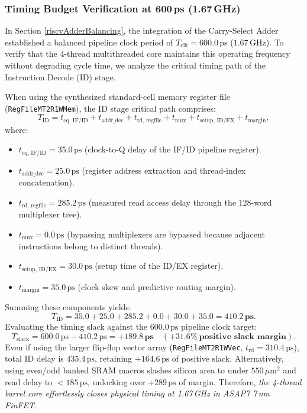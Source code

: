 \subsubsection{Timing Budget Verification at 600\,ps (1.67\,GHz)}
In Section \ref{riscvAdderBalancing}, the integration of the Carry-Select Adder established a balanced pipeline clock period of $T_{\text{clk}} = 600.0\,\text{ps}$ ($1.67\,\text{GHz}$). To verify that the 4-thread multithreaded core maintains this operating frequency without degrading cycle time, we analyze the critical timing path of the Instruction Decode (ID) stage.

When using the synthesized standard-cell memory register file (\texttt{RegFileMT2R1WMem}), the ID stage critical path comprises:
\begin{equation}
T_{\text{ID}} = t_{\text{cq, IF/ID}} + t_{\text{addr\_dec}} + t_{\text{rd, regfile}} + t_{\text{mux}} + t_{\text{setup, ID/EX}} + t_{\text{margin}},
\end{equation}
where:
\begin{itemize}
    \item $t_{\text{cq, IF/ID}} = 35.0\,\text{ps}$ (clock-to-Q delay of the IF/ID pipeline register).
    \item $t_{\text{addr\_dec}} = 25.0\,\text{ps}$ (register address extraction and thread-index concatenation).
    \item $t_{\text{rd, regfile}} = 285.2\,\text{ps}$ (measured read access delay through the 128-word multiplexer tree).
    \item $t_{\text{mux}} = 0.0\,\text{ps}$ (bypassing multiplexers are bypassed because adjacent instructions belong to distinct threads).
    \item $t_{\text{setup, ID/EX}} = 30.0\,\text{ps}$ (setup time of the ID/EX register).
    \item $t_{\text{margin}} = 35.0\,\text{ps}$ (clock skew and predictive routing margin).
\end{itemize}
Summing these components yields:
\begin{equation}
T_{\text{ID}} = 35.0 + 25.0 + 285.2 + 0.0 + 30.0 + 35.0 = \mathbf{410.2\,\text{ps}}.
\end{equation}
Evaluating the timing slack against the $600.0\,\text{ps}$ pipeline clock target:
\begin{equation}
T_{\text{slack}} = 600.0\,\text{ps} - 410.2\,\text{ps} = \mathbf{+189.8\,\text{ps}} \quad (\mathbf{+31.6\% \ \text{positive slack margin}}).
\end{equation}
Even if using the larger flip-flop vector array (\texttt{RegFileMT2R1WVec}, $t_{\text{rd}} = 310.4\,\text{ps}$), total ID delay is $435.4\,\text{ps}$, retaining $+164.6\,\text{ps}$ of positive slack. Alternatively, using even/odd banked SRAM macros \cite{glossner2003sandblaster} slashes silicon area to under $550\,\mu\text{m}^2$ and read delay to $<185\,\text{ps}$, unlocking over $+289\,\text{ps}$ of margin. Therefore, \textit{the 4-thread barrel core effortlessly closes physical timing at 1.67\,GHz in ASAP7 7\,nm FinFET}.


